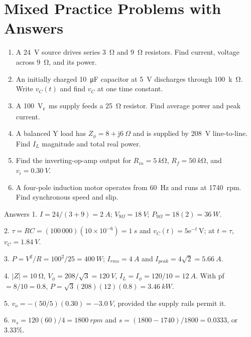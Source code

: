 \documentclass[10pt]{article}
\newcommand{\jj}{\mathrm{j}}
\newcommand{\e}{\mathrm{e}}
\newcommand{\abs}[1]{\left|#1\right|}
\begin{document}
\section{Mixed Practice Problems with Answers}
\begin{enumerate}
  \item A \SI{24}{V} source drives series \SI{3}{\ohm} and \SI{9}{\ohm}
  resistors. Find current, voltage across \SI{9}{\ohm}, and its power.
  \item An initially charged \SI{10}{\micro F} capacitor at \SI{5}{V} discharges
  through \SI{100}{k\ohm}. Write $v_C(t)$ and find $v_C$ at one time constant.
  \item A \SI{100}{V_rms} supply feeds a \SI{25}{\ohm} resistor. Find average
  power and peak current.
  \item A balanced Y load has $Z_\phi=8+\jj6\ \Omega$ and is supplied by
  \SI{208}{V} line-to-line. Find $I_L$ magnitude and total real power.
  \item Find the inverting-op-amp output for $R_{in}=\SI{5}{k\ohm}$,
  $R_f=\SI{50}{k\ohm}$, and $v_i=\SI{0.30}{V}$.
  \item A four-pole induction motor operates from \SI{60}{Hz} and runs at
  \SI{1740}{rpm}. Find synchronous speed and slip.
\end{enumerate}

\begin{keybox}{Answers}
1. $I=24/(3+9)=\SI{2}{A}$; $V_{9\Omega}=\SI{18}{V}$; $P_{9\Omega}=18(2)=\SI{36}{W}$.

2. $\tau=RC=(100\,000)(10\times10^{-6})=\SI{1}{s}$ and
$v_C(t)=5\e^{-t}\ \mathrm{V}$; at $t=\tau$, $v_C=\SI{1.84}{V}$.

3. $P=V^2/R=100^2/25=\SI{400}{W}$; $I_{rms}=\SI{4}{A}$ and
$I_{peak}=4\sqrt2=\SI{5.66}{A}$.

4. $\abs{Z}=\SI{10}{\ohm}$, $V_\phi=208/\sqrt3=\SI{120}{V}$,
$I_L=I_\phi=120/10=\SI{12}{A}$. With pf $=8/10=0.8$,
$P=\sqrt3(208)(12)(0.8)=\SI{3.46}{kW}$.

5. $v_o=-(50/5)(0.30)=\SI{-3.0}{V}$, provided the supply rails permit it.

6. $n_s=120(60)/4=\SI{1800}{rpm}$ and $s=(1800-1740)/1800=0.0333$, or $3.33\%$.
\end{keybox}
\end{document}

